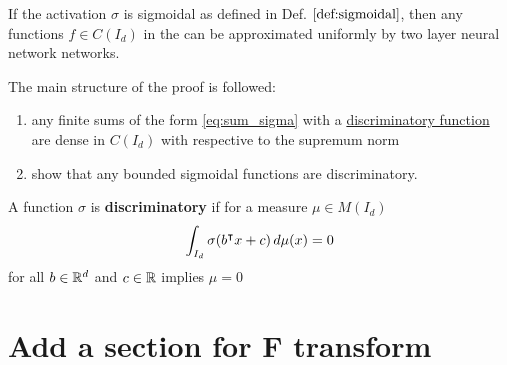 \begin{theorem}
    \label{thm:uat}
    If the activation $\sigma$ is sigmoidal as defined in Def.
    $\ref{def:sigmoidal}$, then any functions $f \in C(I_d)$ in the can be
    approximated uniformly by two layer neural network networks.
\end{theorem}


The main structure of  the proof is followed:
\begin{enumerate}
    \item any finite sums of the form \eqref{eq:sum_sigma} with a
    \hyperref[def:dis_func]{discriminatory function} are dense in $C(I_d)$ with
    respective to the supremum norm 
    \item show that any bounded sigmoidal functions are discriminatory.
\end{enumerate}

\begin{definition}
    \label{def:dis_func}
    A function $\sigma$ is \textbf{discriminatory} if for a measure $\mu \in
    M(I_d)$
    \begin{equation}
        \int_{I_d} \sigma(b{}^{\intercal} x + c) \,d\mu(x) = 0
    \end{equation}
    for all $b \in \mathbb{R}^d$ and $c \in \mathbb{R}$ implies $\mu = 0$
\end{definition}





\section{Add a section for F transform}

